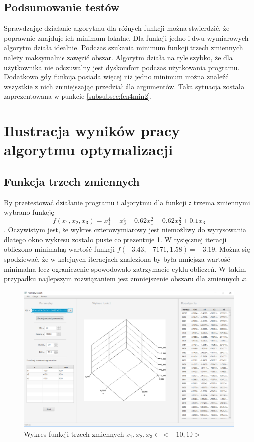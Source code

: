 \documentclass[10pt, a4paper]{article}
\begin{document}
\subsection{Podsumowanie testów}
\label{subsec:podsumowanietestow}
Sprawdzając działanie algorytmu dla różnych funkcji można stwierdzić, że poprawnie znajduje ich minimum lokalne. Dla funkcji jedno i dwu wymiarowych algorytm działa idealnie. Podczas szukania minimum funkcji trzech zmiennych należy maksymalnie zawęzić obszar. Algorytm działa na tyle szybko, że dla użytkownika nie odczuwalny jest dyskomfort podczas użytkowania programu. Dodatkowo gdy funkcja posiada więcej niż jedno minimum można znaleźć wszystkie z nich zmniejszając przedział dla argumentów. Taka sytuacja została zaprezentowana w punkcie \ref{subsubsec:fcn4min2}. 

\section{Ilustracja wyników pracy algorytmu optymalizacji}

\subsection{Funkcja trzech zmiennych}
\label{subsec:trzyzmienne}
By przetestować działanie programu i algorytmu dla funkcji z trzema zmiennymi wybrano funkcję $$f(x_{1},x_{2},x_{3}) = x_{1}^{4}+x_{3}^{4}-0.62x_{1}^{2}-0.62x_{2}^{2}+0.1x_{3}$$. Oczywistym jest, że wykres czterowymiarowy jest niemożliwy do wyrysowania dlatego okno wykresu zostało puste co prezentuje \ref{fig:41}. W tysięcznej iteracji obliczono minimalną wartość funkcji $f(-3.43,-7171,1.58)=-3.19$. Można się spodziewać, że w kolejnych iteracjach znaleziona by była mniejsza wartość minimalna lecz ograniczenie spowodowało zatrzymacie cyklu obliczeń. W takim przypadku najlepszym rozwiązaniem jest zmniejszenie obszaru dla zmiennych $x$.
\begin{figure}[htbp]
	\centering
	\includegraphics[width=.6\textwidth]{images/41.PNG}
	\caption{Wykres funkcji trzech zmiennych $x_{1}, x_{2}, x_{3} \in <-10,10>$}
	\label{fig:41}
\end{figure}
\end{document}
